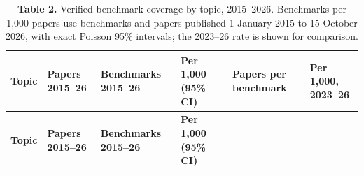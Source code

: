 \documentclass[11pt]{article}
\newenvironment{tablefont}{\par\scriptsize\setlength{\tabcolsep}{3.5pt}}{\par}
\newcommand{\thead}[1]{\textbf{#1}}
\begin{document}
\begin{tablefont}

\begin{longtable}[l]{@{}
  >{\raggedright\arraybackslash}p{}
  >{\raggedright\arraybackslash}p{}
  >{\raggedright\arraybackslash}p{}
  >{\raggedright\arraybackslash}p{}
  >{\raggedright\arraybackslash}p{}
  >{\raggedright\arraybackslash}p{}@{}}
\caption{\textbf{Table 2.} Verified benchmark coverage by topic, 2015--2026.
Benchmarks per 1,000 papers use benchmarks and papers published 1
January 2015 to 15 October 2026, with exact Poisson 95\% intervals; the
2023--26 rate is shown for comparison.}\tabularnewline
\toprule
\begin{minipage}[b]{\linewidth}\raggedright
\thead{Topic}
\end{minipage} & \begin{minipage}[b]{\linewidth}\raggedright
\thead{Papers 2015--26}
\end{minipage} & \begin{minipage}[b]{\linewidth}\raggedright
\thead{Benchmarks 2015--26}
\end{minipage} & \begin{minipage}[b]{\linewidth}\raggedright
\thead{Per 1,000 (95\% CI)}
\end{minipage} & \begin{minipage}[b]{\linewidth}\raggedright
\thead{Papers per benchmark}
\end{minipage} & \begin{minipage}[b]{\linewidth}\raggedright
\thead{Per 1,000, 2023--26}
\end{minipage} \\
\midrule
\endfirsthead
\toprule
\begin{minipage}[b]{\linewidth}\raggedright
\thead{Topic}
\end{minipage} & \begin{minipage}[b]{\linewidth}\raggedright
\thead{Papers 2015--26}
\end{minipage} & \begin{minipage}[b]{\linewidth}\raggedright
\thead{Benchmarks 2015--26}
\end{minipage} & \begin{minipage}[b]{\linewidth}\raggedright
\thead{Per 1,000 (95\% CI)}
\end{minipage} & \begin{minipage}[b]{\linewidth}\raggedright

\end{minipage}
\end{longtable}
\end{tablefont}
\end{document}
